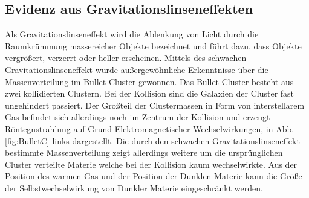 \subsection*{Evidenz aus Gravitationslinseneffekten}
Als Gravitationslinseneffekt wird die Ablenkung von Licht durch die Raumkrümmung massereicher Objekte bezeichnet und führt dazu, dass Objekte vergrößert, verzerrt oder heller erscheinen\cite{Massey2010}.
Mittels des schwachen Gravitationslinseneffekt wurde außergewöhnliche Erkenntnisse über die Massenverteilung im Bullet Cluster gewonnen.
Das Bullet Cluster besteht aus zwei kollidierten Clustern.
Bei der Kollision sind die Galaxien der Cluster fast ungehindert passiert.
Der Großteil der Clustermassen in Form von interstellarem Gas befindet sich allerdings noch im Zentrum der Kollision und erzeugt Röntegnstrahlung auf Grund Elektromagnetischer Wechselwirkungen, in Abb. \ref{fig:BulletC} links dargestellt.
Die durch den schwachen Gravitationslinseneffekt bestimmte Massenverteilung zeigt allerdings weitere um die ursprünglichen Cluster verteilte Materie welche bei der Kollision kaum wechselwirkte.
Aus der Position des warmen Gas und der Position der Dunklen Materie kann die Größe der Selbstwechselwirkung von Dunkler Materie eingeschränkt werden.\cite{Markevitch2003}
